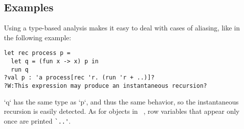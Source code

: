 \documentclass[9pt,preprint]{sigplanconf}
\begin{document}
\subsection{Examples}
%

Using a type-based analysis makes it easy to deal with cases of aliasing, like in the following example:
\begin{lstlisting}
let rec process p =
  let q = (fun x -> x) p in
  run q 
?val p : 'a process[rec 'r. (run 'r + ..)]?
?W:This expression may produce an instantaneous recursion?
\end{lstlisting}
`q` has the same type as `p`, and thus the same behavior, so the instantaneous recursion is easily detected. As for objects in \ocaml~\cite{Vouillon:2008}, row variables that appear only once are printed \verb+`..'+.
\end{document}
